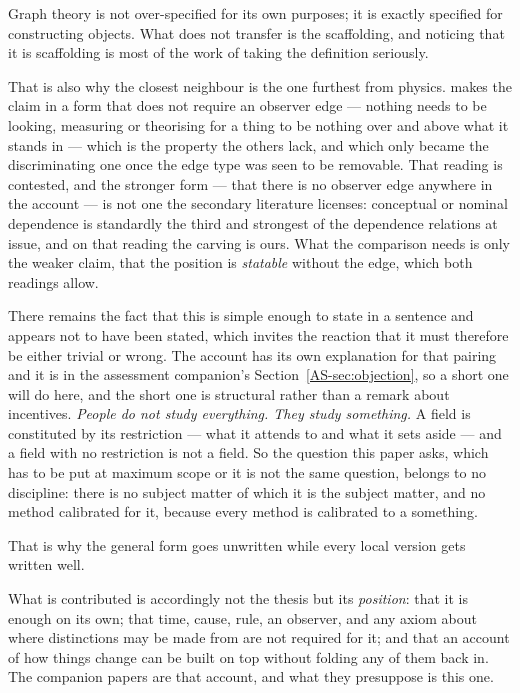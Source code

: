 \documentclass[11pt,a4paper]{article}
\begin{document}
Graph theory is not over-specified for its
own purposes; it is exactly specified for constructing objects. What does not transfer is the
scaffolding, and noticing that it is scaffolding is most of the work of taking the definition
seriously.

That is also why the closest neighbour is the one furthest from physics. \citet{nagarjuna1995} makes the
claim in a form that does not require an observer edge --- nothing needs to be looking, measuring or
theorising for a thing to be nothing over and above what it stands in --- which is the property the
others lack, and which only became the discriminating one once the edge type was seen to be removable.
That reading is contested, and the stronger form --- that there is no observer edge anywhere in the
account --- is not one the secondary literature licenses: conceptual or nominal dependence
is standardly the third and strongest of the dependence relations at issue, and on that reading the
carving is ours. What the comparison needs is only the weaker claim, that the position is
\emph{statable} without the edge, which both readings allow.

There remains the fact that this is simple enough to state in a sentence and appears not to have been
stated, which invites the reaction that it must therefore be either trivial or wrong. The account has its own explanation
for that pairing and it is in the assessment companion's Section~\ref{AS-sec:objection}, so a short one
will do here, and the short one
is structural rather than a remark about incentives. \emph{People do not study everything. They study
something.} A field is constituted by its restriction --- what it attends to and what it sets aside ---
and a field with no restriction is not a field. So the question this paper asks, which has to be put at
maximum scope or it is not the same question, belongs to no discipline: there is no subject matter of
which it is the subject matter, and no method calibrated for it, because every method is calibrated to
a something.

That is why the general form goes unwritten while every local version gets written well.



What is contributed is accordingly not the thesis but its \emph{position}: that it is enough on its own;
that time, cause, rule, an observer, and any axiom about where distinctions may be made from are not
required for it; and that an account of how things change can be built on top without folding any of
them back in. The companion papers are that account, and what they presuppose is this one.
\end{document}
